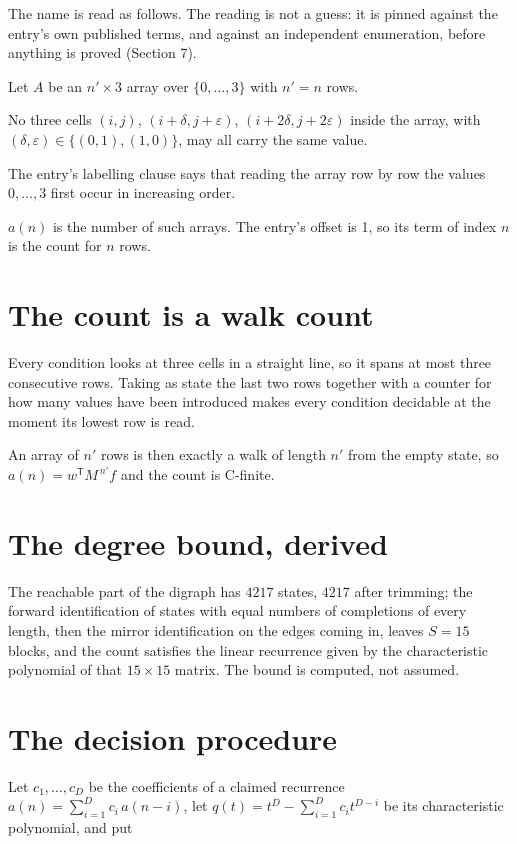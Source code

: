 \documentclass[11pt]{article}
\theoremstyle{definition}
\begin{document}
The name is read as follows. The reading is not a guess: it is pinned against the entry's own published terms, and against an independent enumeration, before anything is proved (Section 7).

Let $A$ be an $n' \times 3$ array over $\{0,\dots,3\}$ with $n' = n$ rows.

No three cells $(i,j)$, $(i{+}\delta,j{+}\varepsilon)$, $(i{+}2\delta,j{+}2\varepsilon)$ inside the array, with $(\delta,\varepsilon) \in \{(0,1), (1,0)\}$, may all carry the same value.

The entry's labelling clause says that reading the array row by row the values $0,\dots,3$ first occur in increasing order.

$a(n)$ is the number of such arrays. The entry's offset is 1, so its term of index $n$ is the count for $n$ rows.

\section{The count is a walk count}

Every condition looks at three cells in a straight line, so it spans at most three consecutive rows. Taking as state the last two rows together with a counter for how many values have been introduced makes every condition decidable at the moment its lowest row is read.

An array of $n'$ rows is then exactly a walk of length $n'$ from the empty state, so $a(n) = w^{\mathsf T}M^{\,n'}f$ and the count is C-finite.

\section{The degree bound, derived}

The reachable part of the digraph has $4217$ states, $4217$ after trimming; the forward identification of states with equal numbers of completions of every length, then the mirror identification on the edges coming in, leaves $S = 15$ blocks, and the count satisfies the linear recurrence given by the characteristic polynomial of that $15\times15$ matrix. The bound is computed, not assumed.

\section{The decision procedure}

Let $c_1,\dots,c_D$ be the coefficients of a claimed recurrence $a(n) = \sum_{i=1}^{D} c_i\,a(n-i)$, let $q(t) = t^{D} - \sum_{i=1}^{D} c_i t^{D-i}$ be its characteristic polynomial, and put
\end{document}
